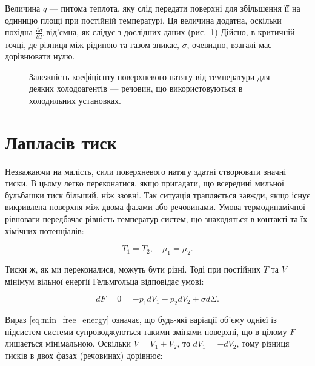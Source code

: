Величина $q$ --- питома теплота, яку слід передати поверхні для збільшення її на одиницю площі при постійній температурі. Ця величина додатна, оскільки  похідна $\frac{\partial \sigma}{\partial T}$ від’ємна, як слідує з дослідних даних (рис.~\ref{pic:Pic9.5}) Дійсно, в критичній точці, де різниця між рідиною та газом зникає, $\sigma$, очевидно, взагалі має дорівнювати нулю.

\begin{figure}[h!]\centering

\caption{Залежність коефіцієнту поверхневого натягу від температури для деяких холодоагентів --- речовин, що використовуються в холодильних установках.}
\label{pic:Pic9.5}
\end{figure}


\section{Лапласів тиск}

Незважаючи на малість, сили поверхневого натягу здатні створювати значні тиски. В цьому легко переконатися, якщо пригадати,  що всередині мильної бульбашки тиск більший, ніж ззовні. Так ситуація трапляється завжди, якщо існує викривлена поверхня між двома фазами або речовинами. Умова термодинамічної рівноваги передбачає рівність температур  систем, що знаходяться в контакті та їх хімічних потенціалів:

\begin{equation}
    T_1 = T_2, \quad \mu_1 = \mu_2.
\end{equation}

Тиски ж, як ми переконалися, можуть бути різні. Тоді при постійних $T$ та $V$ мінімум вільної енергії Гельмгольца відповідає умові:

\begin{equation}
    dF = 0 = -p_1dV_1 - p_2dV_2 + \sigma d\Sigma.
    \label{eq:min_free_energy}
\end{equation}

Вираз \eqref{eq:min_free_energy} означає, що будь-які варіації об’єму однієї із підсистем системи супроводжуються такими змінами поверхні, що в цілому $F$ лишається мінімальною. Оскільки $V = V_1 + V_2$, то $dV_1 = -dV_2$, тому різниця тисків в двох фазах (речовинах) дорівнює:


